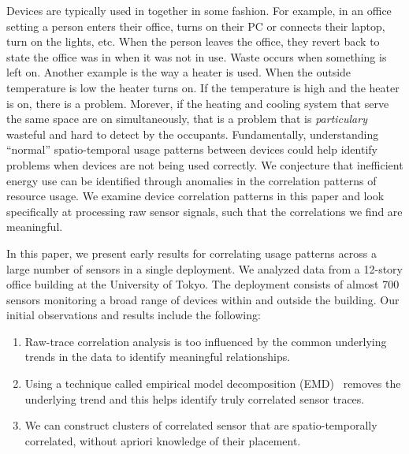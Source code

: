 Devices are typically used in together in some fashion.  For example, in an office
setting a person enters their office, turns on their PC or connects their laptop, turn on the lights, etc.
When the person leaves the office, they revert back to state the office was in when it was
not in use.  Waste occurs when something is left on.  Another example is the way a heater is used.  
When the outside temperature is low the heater turns on.  If the temperature is high and the heater is on, there
is a problem.  Morever, if the heating and cooling system that serve the same space are on simultaneously, that
is a problem that is \emph{particulary} wasteful and hard to detect by the occupants.  
Fundamentally, understanding ``normal'' spatio-temporal usage patterns between devices could help
identify problems when devices are not being used correctly. %
We conjecture that inefficient energy use can be identified through anomalies in the correlation
patterns of resource usage.  We examine device correlation patterns in this paper and look specifically
at processing raw sensor signals, such that the correlations we find are meaningful.


 

In this paper, we present early results for correlating usage patterns across a large number of sensors
in a single deployment.  We analyzed data from a 12-story office building at the University of Tokyo.  
The deployment consists of almost 700 sensors monitoring a broad range of devices within and outside 
the building.  Our initial observations and results include the following:

\begin{enumerate}
\item Raw-trace correlation analysis is too influenced by the common underlying trends in the data
	to identify meaningful relationships.
\item Using a technique called empirical model decomposition (EMD)~\cite{huang:emd1998} removes the 
		underlying trend and this helps identify truly correlated sensor traces.
\item We can construct clusters of correlated sensor that are spatio-temporally correlated, without
		apriori knowledge of their placement.
\end{enumerate}

